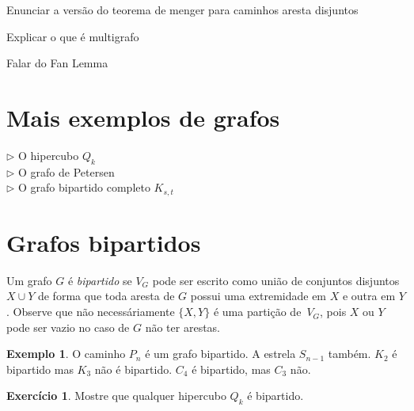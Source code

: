 \documentclass[12pt, a4paper]{article}
\theoremstyle{definition}
\newtheorem{exem}[teor]{Exemplo}
\newtheorem{exer}{Exercício}
\begin{document}



Enunciar a versão do teorema de menger para caminhos aresta disjuntos


Explicar o que é multigrafo

Falar do Fan Lemma 








\section{Mais exemplos de grafos}

$\rhd$ O hipercubo $Q_k$\\
$\rhd$ O grafo de Petersen\\
$\rhd$ O grafo bipartido completo $K_{s,t}$


\section {Grafos bipartidos}

Um grafo $G$ é \emph{bipartido} se $V_G$ pode ser escrito como união de conjuntos disjuntos $X \cup Y$ de forma que toda aresta de $G$ possui uma extremidade em $X$ e outra em $Y$. Observe que não necessáriamente $\{X,Y\}$ é uma partição de~$V_G$, pois $X$ ou $Y$ pode ser vazio no caso de $G$ não ter arestas.

\begin{exem}
O caminho $P_n$ é um grafo bipartido. A estrela $S_{n-1}$ também. $K_2$ é bipartido mas $K_3$ não é bipartido. $C_4$ é bipartido, mas $C_3$ não.
\end{exem}

\begin{exer}
Mostre que qualquer hipercubo $Q_k$ é bipartido. 
\end{exer}
\end{document}
